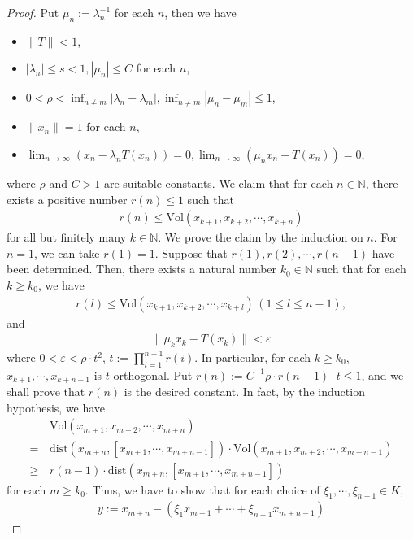 \documentclass[12pt]{amsart}
\theoremstyle{plain}
\theoremstyle{definition}
\begin{document}
\begin{proof}
Put $\mu_n := \lambda_n^{-1}$ for each $n$, then we have
\begin{itemize}
  \item $\|T\| < 1$,
  \item $|\lambda_n| \le s < 1, |\mu_n| \le C$ for each $n$,
  \item $0 < \rho < \inf_{n \neq m} |\lambda_n - \lambda_m|, \inf_{n \neq m} |\mu_n - \mu_m| \le 1$,
  \item $\|x_n\| = 1$ for each $n$,
  \item $\lim_{n \to \infty}(x_n - \lambda_n T(x_n)) = 0, \lim_{n \to \infty}(\mu_n x_n - T(x_n)) = 0$,
\end{itemize}
where $\rho$ and $C > 1$ are suitable constants. We claim that for each $n \in \mathbb{N}$, there exists a positive number $r(n) \le 1$ such that 
\begin{align*}
  r(n) \le \text{Vol}(x_{k+1}, x_{k+2}, \cdots, x_{k+n}) 
\end{align*}
for all but finitely many $k \in \mathbb{N}$. We prove the claim by the induction on $n$. For $n = 1$, we can take $r(1) = 1$. Suppose that $r(1), r(2), \cdots, r(n-1)$ have been determined. Then, there exists a natural number $k_0 \in \mathbb{N}$ such that for each $k \ge k_0$, we have
\begin{align*}
  r(l) \le \text{Vol}(x_{k+1}, x_{k+2}, \cdots, x_{k+l}) \, (1 \le l \le n-1),
\end{align*}
and
\begin{align*}
  \|\mu_k x_k - T(x_k)\| < \varepsilon
\end{align*}
where $0 < \varepsilon < \rho \cdot t^2$, $t := \prod_{i=1}^{n-1}r(i)$. In particular, for each $k \ge k_0$, $x_{k+1}, \cdots, x_{k+n-1}$ is $t$-orthogonal. Put $r(n) := C^{-1}\rho \cdot r(n-1) \cdot t \le 1$, and we shall prove that $r(n)$ is the desired constant. In fact, by the induction hypothesis, we have 
\begin{align*}
  & \text{Vol}(x_{m+1}, x_{m+2}, \cdots, x_{m+n}) \\
  = \, & \text{dist}(x_{m+n}, [x_{m+1}, \cdots, x_{m+n-1}]) \cdot \text{Vol}(x_{m+1}, x_{m+2}, \cdots, x_{m+n-1}) \\
  \ge \, &  r(n-1) \cdot \text{dist}(x_{m+n}, [x_{m+1}, \cdots, x_{m+n-1}])
\end{align*}
for each $m \ge k_0$. Thus, we have to show that for each choice of $\xi_1, \cdots, \xi_{n-1} \in K$,
  \begin{align*}
    y := x_{m+n} - (\xi_1 x_{m+1} + \cdots + \xi_{n-1}x_{m+n-1})

\end{align*}
\end{proof}
\end{document}
